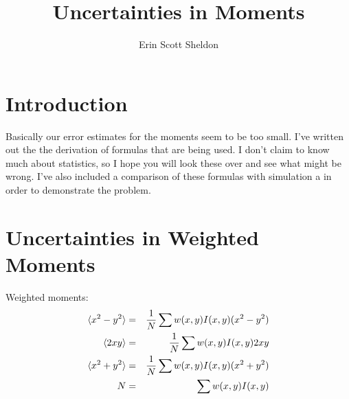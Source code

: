 \documentclass[preprint]{aastex}
\begin{document}
\title{Uncertainties in Moments}

\author{ Erin Scott Sheldon }

\keywords{}

\section{Introduction}\label{intro}

Basically our error estimates for the moments seem to be too small.  I've
written out the the derivation of formulas that are being used. I don't claim
to know much about statistics, so I hope you will look these over and see
what might be wrong. I've also included a comparison of these formulas with
simulation a in order to demonstrate the problem.

\section{Uncertainties in Weighted Moments}

Weighted moments:
\begin{eqnarray}
\langle x^2-y^2 \rangle & = & { 1 \over N } \sum w(x,y) I(x,y) (x^2-y^2) \label{eq1} \\
\langle 2xy \rangle & = & { 1 \over N } \sum w(x,y) I(x,y) 2xy  \label{eq2} \\
\langle x^2+y^2 \rangle & = & { 1 \over N } \sum w(x,y) I(x,y) (x^2+y^2) \label{eq3}  \\
                      N & = & \sum w(x,y) I(x,y)
\end{eqnarray}
\end{document}
